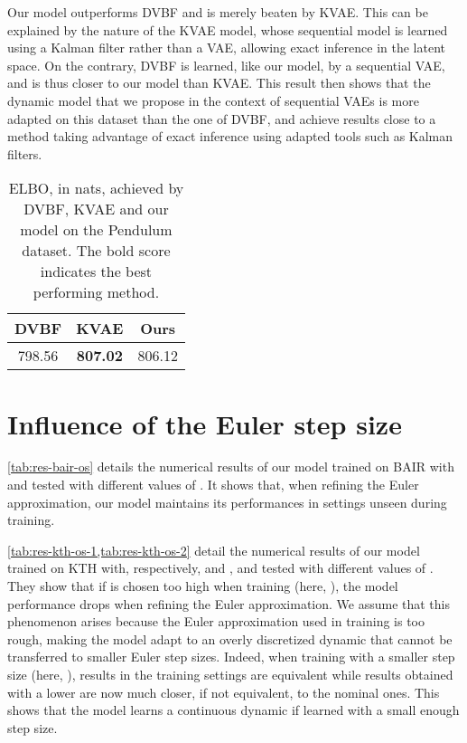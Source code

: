 \documentclass{article}
\begin{document}
Our model outperforms DVBF and is merely beaten by KVAE.
This can be explained by the nature of the KVAE model, whose sequential model is learned using a Kalman filter rather than a VAE, allowing exact inference in the latent space.
On the contrary, DVBF is learned, like our model, by a sequential VAE, and is thus closer to our model than KVAE.
This result then shows that the dynamic model that we propose in the context of sequential VAEs is more adapted on this dataset than the one of DVBF, and achieve results close to a method taking advantage of exact inference using adapted tools such as Kalman filters.

\begin{table}
    \caption{
        \label{tab:res-pendulum}
        ELBO, in nats, achieved by DVBF, KVAE and our model on the Pendulum dataset.
        The bold score indicates the best performing method.
    }
    \renewrobustcmd{\boldmath}{}
    \vspace{0.1in}
    \centering
    \begin{tabular}{S[table-format=3.2]S[table-format=3.2]S[table-format=3.2]}
        \toprule
        {DVBF} & {KVAE} & {Ours} \tabularnewline
        \midrule
        \num{798.56} & \bfseries \num{807.02} & \num{806.12} \tabularnewline
        \bottomrule
    \end{tabular}
\end{table}
 

\section{Influence of the Euler step size}
\label{app:Oversampling}

\cref{tab:res-bair-os} details the numerical results of our model trained on BAIR with  and tested with different values of .
It shows that, when refining the Euler approximation, our model maintains its performances in settings unseen during training.

\cref{tab:res-kth-os-1,tab:res-kth-os-2} detail the numerical results of our model trained on KTH with, respectively,  and , and tested with different values of .
They show that if  is chosen too high when training (here, ), the model performance drops when refining the Euler approximation.
We assume that this phenomenon arises because the Euler approximation used in training is too rough, making the model adapt to an overly discretized dynamic that cannot be transferred to smaller Euler step sizes.
Indeed, when training with a smaller step size (here, ), results in the training settings are equivalent while results obtained with a lower  are now much closer, if not equivalent, to the nominal ones.
This shows that the model learns a continuous dynamic if learned with a small enough step size.
\end{document}

